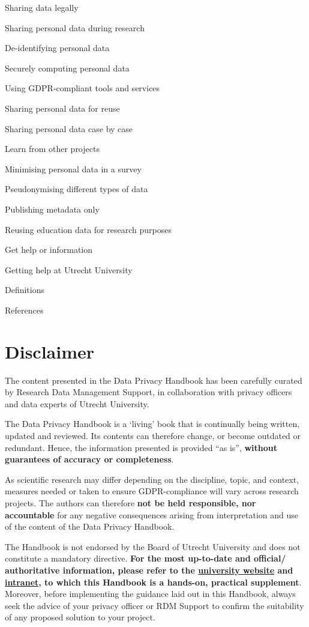 \documentclass[
]{book}
\begin{document}
Sharing data legally

Sharing personal data during research

De-identifying personal data

Securely computing personal data

Using GDPR-compliant tools and services

Sharing personal data for reuse

Sharing personal data case by case

Learn from other projects

Minimising personal data in a survey

Pseudonymising different types of data

Publishing metadata only

Reusing education data for research purposes

Get help or information

Getting help at Utrecht University

Definitions

References

\hypertarget{disclaimer}{%
\section{Disclaimer}\label{disclaimer}}

The content presented in the Data Privacy Handbook has been carefully curated by
Research Data Management Support, in collaboration with privacy officers and
data experts of Utrecht University.

The Data Privacy Handbook is a `living' book that is continually being written,
updated and reviewed. Its contents can therefore change, or become outdated or
redundant. Hence, the information presented is provided ``as is'', \textbf{without
guarantees of accuracy or completeness}.

As scientific research may differ depending on the discipline, topic, and
context, measures needed or taken to ensure GDPR-compliance will vary across
research projects. The authors can therefore \textbf{not be held responsible, nor
accountable} for any negative consequences arising from interpretation and use
of the content of the Data Privacy Handbook.

The Handbook is not endorsed by the Board of Utrecht University and does not
constitute a mandatory directive. \textbf{For the most up-to-date and official/
authoritative information, please refer to the
\href{https://www.uu.nl/en/research/research-data-management}{university website}
and \href{https://intranet.uu.nl/en/knowledge-base/privacy-at-uu}{intranet},
to which this Handbook is a hands-on, practical supplement}. Moreover, before
implementing the guidance laid out in this Handbook, always seek the advice of
your privacy officer or RDM Support to confirm the suitability of any proposed
solution to your project.
\end{document}

